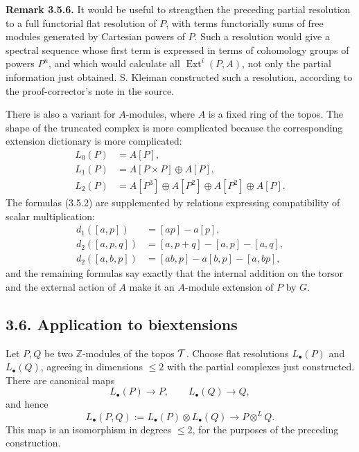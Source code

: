 \documentclass[11pt]{article}
\providecommand{\Z}{\mathbb Z}
\providecommand{\Ext}{\operatorname{Ext}}
\begin{document}
\textbf{Remark 3.5.6.}  It would be useful to strengthen the preceding partial resolution to a full functorial flat resolution of \(P\), with terms functorially sums of free modules generated by Cartesian powers of \(P\).  Such a resolution would give a spectral sequence whose first term is expressed in terms of cohomology groups of powers \(P^n\), and which would calculate all \(\Ext^i(P,A)\), not only the partial information just obtained.  S. Kleiman constructed such a resolution, according to the proof-corrector's note in the source.

There is also a variant for \(A\)-modules, where \(A\) is a fixed ring of the topos.  The shape of the truncated complex is more complicated because the corresponding extension dictionary is more complicated:
\begin{align}\tag{3.5.9}
L_0(P)&=A[P],\\
L_1(P)&=A[P\times P]\oplus A[P],\\
L_2(P)&=A[P^3]\oplus A[P^2]\oplus A[P^2]\oplus A[P].
\end{align}
The formulas (3.5.2) are supplemented by relations expressing compatibility of scalar multiplication:
\begin{align}\tag{3.5.10}
 d_1([a,p])&=[ap]-a[p],\\
 d_2([a,p,q])&=[a,p+q]-[a,p]-[a,q],\\
 d_2([a,b,p])&=[ab,p]-a[b,p]-[a,bp],
\end{align}
and the remaining formulas say exactly that the internal addition on the torsor and the external action of \(A\) make it an \(A\)-module extension of \(P\) by \(G\).

\subsection*{3.6. Application to biextensions}
Let \(P,Q\) be two \(\Z\)-modules of the topos \(\mathcal T\).  Choose flat resolutions \(L_\bullet(P)\) and \(L_\bullet(Q)\), agreeing in dimensions \(\leq2\) with the partial complexes just constructed.  There are canonical maps
\begin{equation}\tag{3.6.1}
  L_\bullet(P)\to P,
  \qquad
  L_\bullet(Q)\to Q,
\end{equation}
and hence
\begin{equation}\tag{3.6.2}
  L_\bullet(P,Q):=L_\bullet(P)\otimes L_\bullet(Q)
  \longrightarrow P\otimes^{L}Q.
\end{equation}
This map is an isomorphism in degrees \(\leq2\), for the purposes of the preceding construction.
\end{document}
